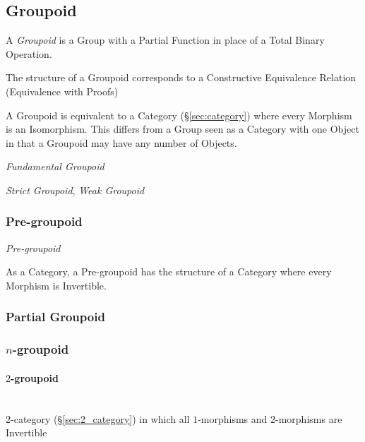 \subsection{Groupoid}\label{sec:groupoid}

A \emph{Groupoid} is a Group with a Partial Function in place of a
Total Binary Operation.

The structure of a Groupoid corresponds to a Constructive Equivalence
Relation (Equivalence with Proofs)

A Groupoid is equivalent to a Category (\S\ref{sec:category}) where
every Morphism is an Isomorphism. This differs from a Group seen as a
Category with one Object in that a Groupoid may have any number of
Objects.

\emph{Fundamental Groupoid}

\emph{Strict Groupoid}, \emph{Weak Groupoid}



\subsubsection{Pre-groupoid}\label{sec:pre_groupoid}

\emph{Pre-groupoid}

As a Category, a Pre-groupoid has the structure of a Category where
every Morphism is Invertible.



\subsubsection{Partial Groupoid}\label{sec:partial_groupoid}

\subsubsection{$n$-groupoid}\label{sec:n_groupoid}

\paragraph{$2$-groupoid}\label{sec:2_groupoid}
\hfill \\

$2$-category (\S\ref{sec:2_category}) in which all $1$-morphisms and
$2$-morphisms are Invertible



